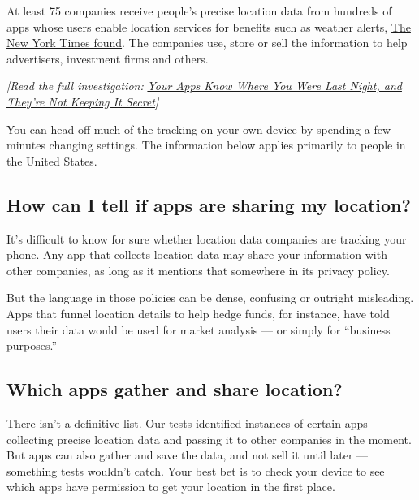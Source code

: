 At least 75 companies receive people's precise location data from
hundreds of apps whose users enable location services for benefits such
as weather alerts,
\href{https://www.nytimes.com/interactive/2018/12/10/business/location-data-privacy-apps.html}{The
New York Times found}. The companies use, store or sell the information
to help advertisers, investment firms and others.

\emph{{[}Read the full investigation:}
\href{https://www.nytimes.com/interactive/2018/12/10/business/location-data-privacy-apps.html}{\emph{Your
Apps Know Where You Were Last Night, and They're Not Keeping It
Secret}}\emph{{]}}

You can head off much of the tracking on your own device by spending a
few minutes changing settings. The information below applies primarily
to people in the United States.

\hypertarget{how-can-i-tell-if-apps-are-sharing-my-location}{%
\subsection{How can I tell if apps are sharing my
location?}\label{how-can-i-tell-if-apps-are-sharing-my-location}}

It's difficult to know for sure whether location data companies are
tracking your phone. Any app that collects location data may share your
information with other companies, as long as it mentions that somewhere
in its privacy policy.

But the language in those policies can be dense, confusing or outright
misleading. Apps that funnel location details to help hedge funds, for
instance, have told users their data would be used for market analysis
--- or simply for ``business purposes.''

\hypertarget{which-apps-gather-and-share-location}{%
\subsection{Which apps gather and share
location?}\label{which-apps-gather-and-share-location}}

There isn't a definitive list. Our tests identified instances of certain
apps collecting precise location data and passing it to other companies
in the moment. But apps can also gather and save the data, and not sell
it until later --- something tests wouldn't catch. Your best bet is to
check your device to see which apps have permission to get your location
in the first place.

